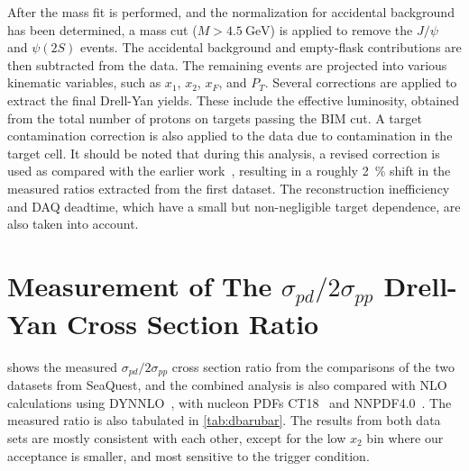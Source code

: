 \documentclass[reprint,aps,unsortedaddress,superscriptaddress,prl,floatfix,showpacs,linenumbers,final]{revtex4-2}
\begin{document}
After the mass fit is performed, and the normalization for accidental background has been determined,
a mass cut ($M>\SI{4.5}{\GeV}$) is applied to remove the $J/\psi$ and $\psi\left(2S\right)$ events.
The accidental background and empty-flask contributions are then subtracted from the data.
The remaining events are projected into various kinematic variables, such as $x_1$, $x_2$, $x_F$, and $P_T$.
Several corrections are applied to extract the final Drell-Yan yields.
These include the effective luminosity, obtained from the total number of protons on targets passing the BIM cut.
A target contamination correction is also applied to the  data due to  contamination in the target cell.
It should be noted that during this analysis,
a revised correction is used as compared with the earlier work~\cite{dove2021,dove2023},
resulting in a roughly \SI{2}{\percent} shift in the measured ratios extracted from the first dataset.
The reconstruction inefficiency and DAQ deadtime, which have a small but non-negligible target dependence,
are also taken into account.


\section{Measurement of The \texorpdfstring{$\sigma_{pd}/2\sigma_{pp}$}{pd/2pp} Drell-Yan Cross Section Ratio}
\label{sec:csr}
 shows the measured $\sigma_{pd}/2\sigma_{pp}$ cross section ratio from the comparisons
of the two datasets from SeaQuest, and the combined analysis is also compared with
NLO calculations using DYNNLO~\cite{catani2007,catani2009},
with nucleon PDFs CT18~\cite{hou2021} and NNPDF4.0~\cite{ball2022a}.
The measured ratio is also tabulated in \cref{tab:dbarubar}.
The results from both data sets are mostly consistent with each other, except for the low $x_2$ bin where our acceptance is smaller,
and most sensitive to the trigger condition.

\end{document}
